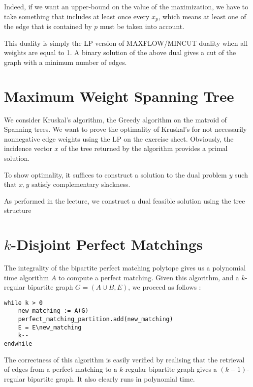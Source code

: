 \documentclass{scrartcl}
\newcommand\1{\mathbf{1}}
\begin{document}
Indeed, if we want an upper-bound on the value of the maximization, we have to take something that includes at least once every $x_p$, which means at least one of the edge that is contained by $p$ must be taken into account. 

This duality is simply the LP version of MAXFLOW/MINCUT duality when all weights are equal to 1. A binary solution of the above dual gives a cut of the graph with a minimum number of edges.

\section{Maximum Weight Spanning Tree}
We consider Kruskal's algorithm, the Greedy algorithm on the matroid of Spanning trees. We want to prove the optimality of Kruskal's for not necessarily nonnegative edge weights using the LP on the exercise sheet. Obviously, the incidence vector $x$ of the tree returned by the algorithm provides a primal solution.

To show optimality, it suffices to construct a solution to the dual problem $y$ such that $x,y$ satisfy complementary slackness.

As performed in the lecture, we construct a dual feasible solution using the tree structure 

\section{$k$-Disjoint Perfect Matchings}

The integrality of the bipartite perfect matching polytope gives us a polynomial time algorithm $A$ to compute a perfect matching. Given this algorithm, and a $k$-regular bipartite graph $G = (A \cup B,E)$, we proceed as follows :

\begin{verbatim}
while k > 0
    new_matching := A(G) 
    perfect_matching_partition.add(new_matching)
    E = E\new_matching
    k--
endwhile
\end{verbatim}

The correctness of this algorithm is easily verified by realising that the retrieval of edges from a perfect matching to a $k$-regular bipartite graph gives a $(k-1)$-regular bipartite graph. It also clearly runs in polynomial time.
\end{document}
